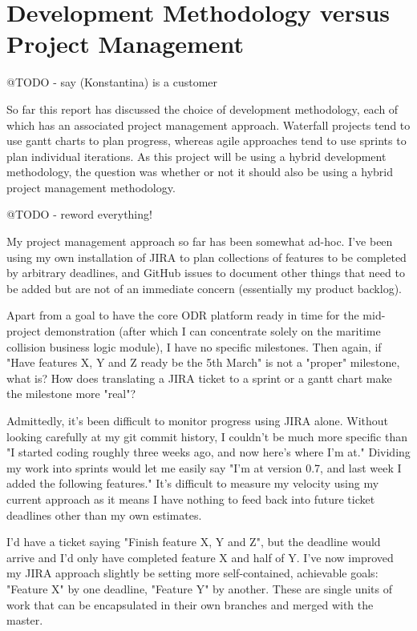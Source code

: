 \section{Development Methodology versus Project Management}

@TODO - say (Konstantina) is a customer 

So far this report has discussed the choice of development methodology, each of which has an associated project management approach. Waterfall projects tend to use gantt charts to plan progress, whereas agile approaches tend to use sprints to plan individual iterations. As this project will be using a hybrid development methodology, the question was whether or not it should also be using a hybrid project management methodology.

@TODO - reword everything!

My project management approach so far has been somewhat ad-hoc. I've been using my own installation of JIRA to plan collections of features to be completed by arbitrary deadlines, and GitHub issues to document other things that need to be added but are not of an immediate concern (essentially my product backlog).

Apart from a goal to have the core ODR platform ready in time for the mid-project demonstration (after which I can concentrate solely on the maritime collision business logic module), I have no specific milestones. Then again, if "Have features X, Y and Z ready be the 5th March" is not a "proper" milestone, what is? How does translating a JIRA ticket to a sprint or a gantt chart make the milestone more "real"?

Admittedly, it's been difficult to monitor progress using JIRA alone. Without looking carefully at my git commit history, I couldn't be much more specific than "I started coding roughly three weeks ago, and now here's where I'm at." Dividing my work into sprints would let me easily say "I'm at version 0.7, and last week I added the following features." It's difficult to measure my velocity using my current approach as it means I have nothing to feed back into future ticket deadlines other than my own estimates.

I'd have a ticket saying "Finish feature X, Y and Z", but the deadline would arrive and I'd only have completed feature X and half of Y. I've now improved my JIRA approach slightly be setting more self-contained, achievable goals: "Feature X" by one deadline, "Feature Y" by another. These are single units of work that can be encapsulated in their own branches and merged with the master.

